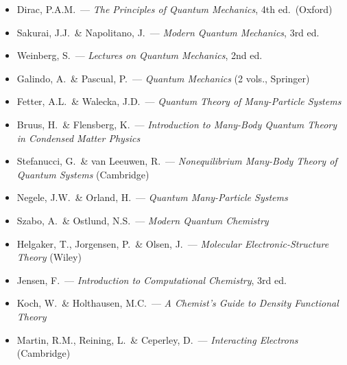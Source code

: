 \documentclass[11pt,a4paper]{article}
\begin{document}
\medskip{}\par\smallskip
\begin{itemize}[leftmargin=1.5em]
  \item Dirac, P.A.M.\ --- \textit{The Principles of Quantum Mechanics}, 4th ed.\ (Oxford)
  \item Sakurai, J.J.\ \& Napolitano, J.\ --- \textit{Modern Quantum Mechanics}, 3rd ed.
  \item Weinberg, S.\ --- \textit{Lectures on Quantum Mechanics}, 2nd ed.
  \item Galindo, A.\ \& Pascual, P.\ --- \textit{Quantum Mechanics} (2 vols., Springer)
\end{itemize}

\medskip{}\par\smallskip
\begin{itemize}[leftmargin=1.5em]
  \item Fetter, A.L.\ \& Walecka, J.D.\ --- \textit{Quantum Theory of Many-Particle Systems}
  \item Bruus, H.\ \& Flensberg, K.\ --- \textit{Introduction to Many-Body Quantum Theory in Condensed Matter Physics}
  \item Stefanucci, G.\ \& van Leeuwen, R.\ --- \textit{Nonequilibrium Many-Body Theory of Quantum Systems} (Cambridge)
  \item Negele, J.W.\ \& Orland, H.\ --- \textit{Quantum Many-Particle Systems}
\end{itemize}

\medskip{}\par\smallskip
\begin{itemize}[leftmargin=1.5em]
  \item Szabo, A.\ \& Ostlund, N.S.\ --- \textit{Modern Quantum Chemistry}
  \item Helgaker, T., Jorgensen, P.\ \& Olsen, J.\ --- \textit{Molecular Electronic-Structure Theory} (Wiley)
  \item Jensen, F.\ --- \textit{Introduction to Computational Chemistry}, 3rd ed.
  \item Koch, W.\ \& Holthausen, M.C.\ --- \textit{A Chemist's Guide to Density Functional Theory}
  \item Martin, R.M., Reining, L.\ \& Ceperley, D.\ --- \textit{Interacting Electrons} (Cambridge)
\end{itemize}

\end{document}
